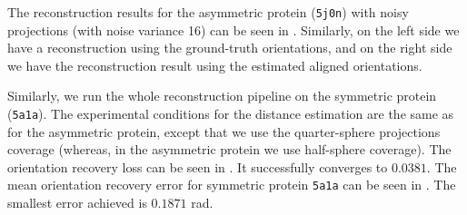 The reconstruction results for the asymmetric protein (\texttt{5j0n}) with noisy projections (with noise variance 16) can be seen in .
Similarly, on the left side we have a reconstruction using the ground-truth orientations, and on the right side we have the reconstruction result using the estimated aligned orientations.

Similarly, we run the whole reconstruction pipeline on the symmetric protein (\texttt{5a1a}).
The experimental conditions for the distance estimation are the same as for the asymmetric protein, except that we use the quarter-sphere projections coverage (whereas, in the asymmetric protein we use half-sphere coverage).
The orientation recovery loss can be seen in . It successfully converges to $0.0381$.
The mean orientation recovery error for symmetric protein \texttt{5a1a} can be seen in . The smallest error achieved is $0.1871$ rad.

